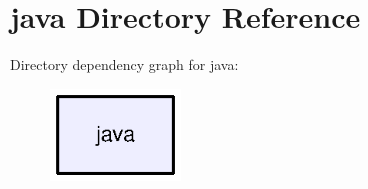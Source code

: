 \section{java Directory Reference}
\label{dir_93c6ba7fb77bae0709fae89c9c13b44a}
Directory dependency graph for java\+:\nopagebreak
\begin{figure}[H]
\begin{center}
\leavevmode
\includegraphics[width=98pt]{dir_93c6ba7fb77bae0709fae89c9c13b44a_dep}
\end{center}
\end{figure}
